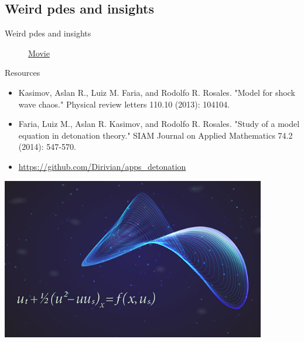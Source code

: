 \documentclass{beamer}
\begin{document}
\subsection{Weird pdes and insights}
\begin{frame}{Weird pdes and insights}
	\begin{figure}[h!]
		\href{https://www.youtube.com/watch?v=RdKBWDUVpls}{Movie} 
	\end{figure} 
\end{frame}
\begin{frame}{Resources}
	\begin{itemize}
		\item Kasimov, Aslan R., Luiz M. Faria, and Rodolfo R. Rosales. "Model for shock wave chaos." Physical review letters 110.10 (2013): 104104.
		\item Faria, Luiz M., Aslan R. Kasimov, and Rodolfo R. Rosales. "Study of a model equation in detonation theory." SIAM Journal on Applied Mathematics 74.2 (2014): 547-570.

		\item \url{https://github.com/Dirivian/apps_detonation} 
	\end{itemize}	
\end{frame}
\begin{frame}{}
	\begin{center}
		\includegraphics[height=200pt]{KASIMOV}\\
		
	\end{center}	
\end{frame}
\end{document}
